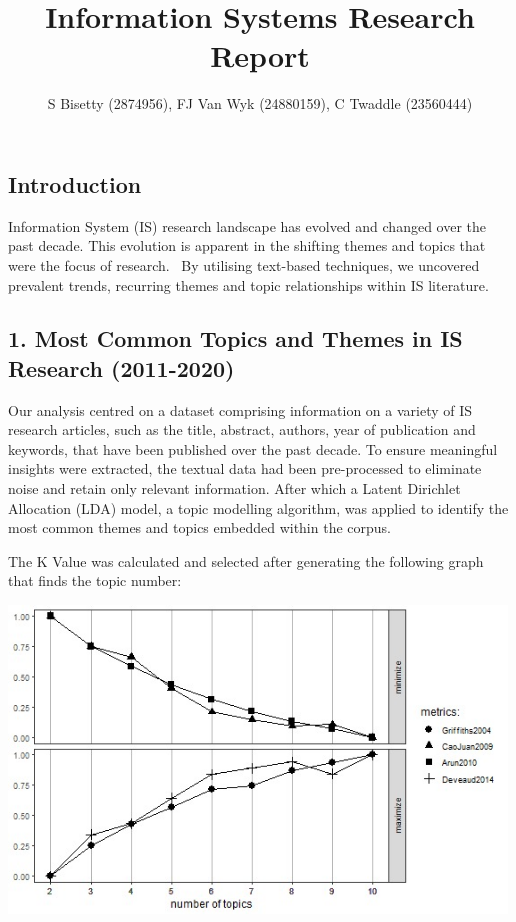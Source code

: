 \documentclass[
  letterpaper,
  DIV=11,
  numbers=noendperiod]{scrartcl}
\title{Information Systems Research Report}
\author{S Bisetty (2874956), FJ Van Wyk (24880159), C Twaddle
(23560444)}
\date{}
\makeatletter
\renewcommand{\maketitle}{\bgroup\setlength{\parindent}{0pt}
\begin{flushleft}
  {\sffamily\huge\textbf{\MakeUppercase{\@title}}} \vspace{0.3cm} \newline
  {\Large {\@subtitle}} \newline
  \@author
\end{flushleft}\egroup
}
\makeatother
\begin{document}
\maketitle
\pagestyle{mystyle}

\ifdefined\Shaded\renewenvironment{Shaded}{\begin{tcolorbox}[boxrule=0pt, enhanced, breakable, borderline west={3pt}{0pt}{shadecolor}, frame hidden, sharp corners, colback={codebgcolor}]}{\end{tcolorbox}}\fi

\hypertarget{introduction}{%
\subsection{\texorpdfstring{\textbf{Introduction}}{Introduction}}\label{introduction}}

Information System (IS) research landscape has evolved and changed over
the past decade. This evolution is apparent in the shifting themes and
topics that were the focus of research. ~By utilising text-based
techniques, we uncovered prevalent trends, recurring themes and topic
relationships within IS literature.

\newpage{}

\hypertarget{most-common-topics-and-themes-in-is-research-2011-2020}{%
\subsection{\texorpdfstring{\textbf{1. Most Common Topics and Themes in
IS Research
(2011-2020)}}{1. Most Common Topics and Themes in IS Research (2011-2020)}}\label{most-common-topics-and-themes-in-is-research-2011-2020}}

Our analysis centred on a dataset comprising information on a variety of
IS research articles, such as the title, abstract, authors, year of
publication and keywords, that have been published over the past decade.
To ensure meaningful insights were extracted, the textual data had been
pre-processed to eliminate noise and retain only relevant information.
After which a Latent Dirichlet Allocation (LDA) model, a topic modelling
algorithm, was applied to identify the most common themes and topics
embedded within the corpus.

The K Value was calculated and selected after generating the following
graph that finds the topic number:

\includegraphics[width=5.20833in,height=\textheight]{images/FindTopicNumbers-01.jpg}
\end{document}
